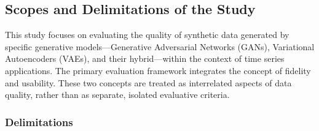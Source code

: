 \documentclass{article}
\begin{document}
\subsection{Scopes and Delimitations of the Study}
This study focuses on evaluating the quality of synthetic data generated by specific generative models—Generative Adversarial Networks (GANs), Variational Autoencoders (VAEs), and their hybrid—within the context of time series applications. The primary evaluation framework integrates the concept of fidelity and usability. These two concepts are treated as interrelated aspects of data quality, rather than as separate, isolated evaluative criteria.

\subsubsection{Delimitations}
\end{document}
